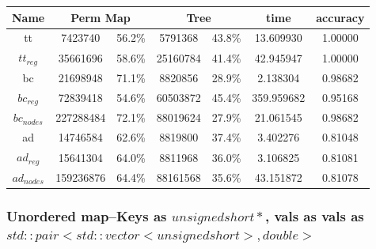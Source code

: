 \documentclass[]{article}
\theoremstyle{definition}
\begin{document}
\begin{center}
\begin{tabular} { |c|c|c|c|c|c|c| }
\hline
Name & \multicolumn{2}{c|}{Perm Map} & \multicolumn{2}{c|}{Tree} & time & accuracy \\
\hline

tt & 7423740 & 56.2\%  & 5791368 & 43.8\% & 13.609930 & 1.00000 \\

$tt_{reg}$ & 35661696 & 58.6\% & 25160784 & 41.4\% & 42.945947 & 1.00000 \\

bc & 21698948 & 71.1\% & 8820856 & 28.9\% & 2.138304 & 0.98682 \\

$bc_{reg}$ & 72839418 & 54.6\% & 60503872 & 45.4\% & 359.959682 & 0.95168 \\

$bc_{nodes}$ & 227288484 & 72.1\% & 88019624 & 27.9\% & 21.061545 & 0.98682 \\

ad & 14746584 & 62.6\% & 8819800 & 37.4\% & 3.402276 & 0.81048 \\

$ad_{reg}$ & 15641304 & 64.0\% & 8811968 & 36.0\% & 3.106825 & 0.81081 \\

$ad_{nodes}$ & 159236876 & 64.4\% & 88161568 & 35.6\% & 43.151872 & 0.81078 \\
\hline
\end{tabular}
\end{center}

\subsubsection{Unordered map--Keys as $unsigned short *$, vals as vals as $std::pair<std::vector<unsigned short>, double>$}
\end{document}
